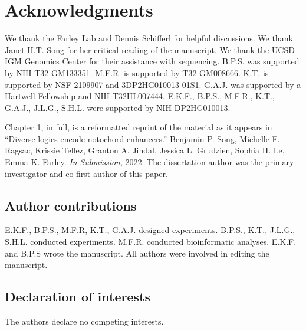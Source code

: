 \section{Acknowledgments}

We thank the Farley Lab and Dennis Schifferl for helpful discussions. We thank Janet H.T. Song for her critical reading of the manuscript. We thank the UCSD IGM Genomics Center for their assistance with sequencing. B.P.S. was supported by NIH T32 GM133351. M.F.R. is supported by T32 GM008666. K.T. is supported by NSF 2109907 and 3DP2HG010013-01S1. G.A.J. was supported by a Hartwell Fellowship and NIH T32HL007444. E.K.F., B.P.S., M.F.R., K.T., G.A.J., J.L.G., S.H.L. were supported by NIH DP2HG010013.

Chapter 1,  in full,  is  a  reformatted  reprint  of  the  material as it appears in “Diverse logics encode notochord enhancers.”  Benjamin P. Song, Michelle F. Ragsac, Krissie Tellez, Granton A. Jindal, Jessica L. Grudzien, Sophia H. Le, Emma K. Farley. \textit{In Submission}, 2022.  The dissertation author was the primary investigator and co-first author of this paper.

\subsection{Author contributions}
E.K.F., B.P.S., M.F.R, K.T., G.A.J. designed experiments. B.P.S., K.T., J.L.G., S.H.L. conducted experiments. M.F.R. conducted bioinformatic analyses. E.K.F. and B.P.S wrote the manuscript. All authors were involved in editing the manuscript.

\subsection{Declaration of interests}
The authors declare no competing interests.
